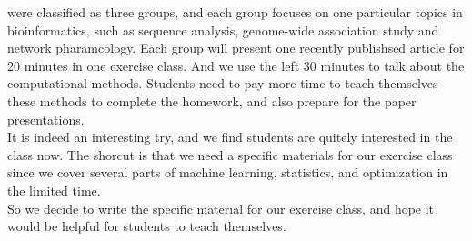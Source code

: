 \documentclass[12pt,a4paper]{book}
\begin{document}
were classified as three groups, and each group focuses on one particular topics
in bioinformatics, such as sequence analysis, genome-wide association study and
network pharamcology. Each group will present one recently publishsed article
for 20 minutes in one exercise class. And we use the left 30 minutes to talk
about the computational methods. Students need to pay more time to teach
themselves these methods to complete the homework, and also prepare for the
paper presentations. \\
It is indeed an interesting try, and we find students are quitely interested in
the class now. The shorcut is that we need a specific materials for our exercise
class since we cover several parts of machine learning, statistics, and
optimization in the limited time.\\
So we decide to write the specific material for our exercise class, and hope it
would be helpful for students to teach themselves.
\end{document}
